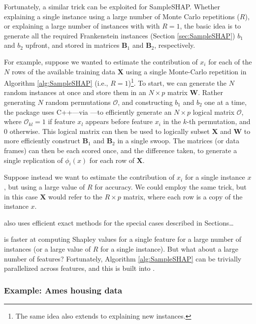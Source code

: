 Fortunately, a similar trick can be exploited for SampleSHAP. Whether
explaining a single instance using a large number of Monte Carlo
repetitions (\(R\)), or explaining a large number of instances with with
\(R = 1\), the basic idea is to generate all the required Frankenstein
instances (Section \ref{sec:SampleSHAP}) \(b_1\) and \(b_2\) upfront,
and stored in matrices \(\boldsymbol{B}_1\) and \(\boldsymbol{B}_2\),
respectively.

For example, suppose we wanted to estimate the contribution of \(x_i\)
for each of the \(N\) rows of the available training data
\(\boldsymbol{X}\) using a single Monte-Carlo repetition in Algorithm
\ref{alg:SampleSHAP} (i.e.,
\(R = 1\))\footnote{The same idea also extends to explaining new instances.}.
To start, we can generate the \(N\) random instances at once and store
them in an \(N \times p\) matrix \(\boldsymbol{W}\). Rather generating
\(N\) random permutations \(\mathcal{O}\), and constructing \(b_1\) and
\(b_2\) one at a time, the  package uses C++---via
 \citep{R-Rcpp}---to efficiently generate an
\(N \times p\) logical matrix \(\boldsymbol{\mathcal{O}}\), where
\(\boldsymbol{\mathcal{O}}_{kl} = 1\) if feature \(x_l\) appears before
feature \(x_i\) in the \(k\)-th permutation, and \(0\) otherwise. This
logical matrix can then be used to logically subset \(\boldsymbol{X}\)
and \(\boldsymbol{W}\) to more efficiently construct
\(\boldsymbol{B}_1\) and \(\boldsymbol{B}_2\) in a single swoop. The
matrices (or data frames) can then be each scored once, and the
difference taken, to generate a single replication of
\(\phi_i\left(x\right)\) for each row of \(\boldsymbol{X}\).

Suppose instead we want to estimate the contribution of \(x_i\) for a
single instance \(x\), but using a large value of \(R\) for accuracy. We
could employ the same trick, but in this case \(\boldsymbol{X}\) would
refer to the \(R \times p\) matrix, where each row is a copy of the
instance \(x\).

 also uses efficient exact methods for the special cases
described in Sections\ldots{}

 is faster at computing Shapley values for a single
feature for a large number of instances (or a large value of \(R\) for a
single instance). But what about a large number of features?
Fortunately, Algorithm \ref{alg:SampleSHAP} can be trivially
parallelized across features, and this is built into .

\subsubsection{Example: Ames housing data}


